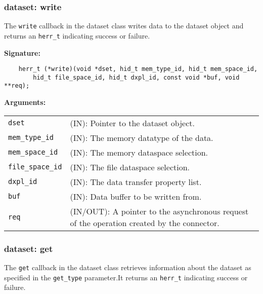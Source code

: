 \subsubsection{dataset: write}
The \texttt{write} callback in the dataset class writes data to
the dataset object and returns an \texttt{herr\_t} indicating success or
failure.\bigskip

\begin{mdframed}[style=bgbox]
\textbf{Signature:}
\begin{lstlisting}
    herr_t (*write)(void *dset, hid_t mem_type_id, hid_t mem_space_id, 
        hid_t file_space_id, hid_t dxpl_id, const void *buf, void **req);
\end{lstlisting}

\textbf{Arguments:}\\
\begin{tabular}{l p{13.5cm}}
  \texttt{dset} & (IN): Pointer to the dataset object.\\
  \texttt{mem\_type\_id} & (IN): The memory datatype of the data.\\
  \texttt{mem\_space\_id} & (IN): The memory dataspace selection.\\
  \texttt{file\_space\_id} & (IN): The file dataspace selection.\\
  \texttt{dxpl\_id} & (IN): The data transfer property list.\\
  \texttt{buf} & (IN): Data buffer to be written from.\\
  \texttt{req} & (IN/OUT): A pointer to the asynchronous request of the
  operation created by the connector.\\
\end{tabular}
\end{mdframed}

\subsubsection{dataset: get}
The \texttt{get} callback in the dataset class retrieves
information about the dataset as specified in the \texttt{get\_type}
parameter.It returns an \texttt{herr\_t} indicating success or failure.\bigskip


